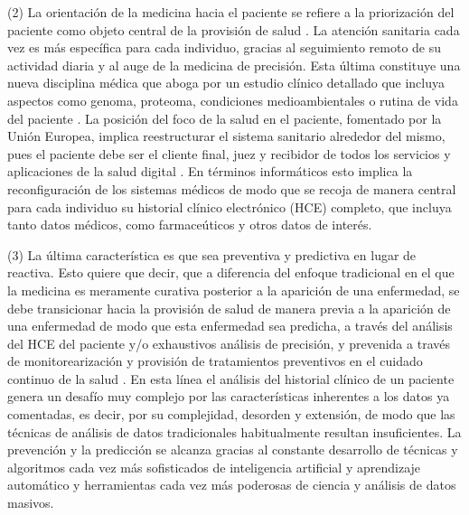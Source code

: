 
(2) La orientación de la medicina hacia el paciente se refiere a la priorización del paciente como objeto central de la provisión de salud  \cite{tortorella2020healthcare}. La atención sanitaria cada vez es más específica para cada individuo, gracias al seguimiento remoto de su actividad diaria y al auge de la medicina de precisión. Esta última constituye una nueva disciplina médica que aboga por un estudio clínico detallado que incluya aspectos como genoma, proteoma, condiciones medioambientales o rutina de vida del paciente \cite{ruiz2023inteligencia}. La posición del foco de la salud en el paciente, fomentado por la Unión Europea,  implica reestructurar el sistema sanitario alrededor del mismo, pues el paciente debe ser el cliente final, juez y recibidor de todos los servicios y aplicaciones de la salud digital \cite{ntafi2022legal} \cite{katehakis2019framework}. En términos informáticos esto implica la reconfiguración de los sistemas médicos de modo que se recoja de manera central para cada individuo su historial clínico electrónico (HCE) completo, que incluya tanto datos médicos, como farmaceúticos y otros datos de interés.  



(3) La última característica es que sea preventiva y predictiva en lugar de reactiva. Esto quiere que decir, que a diferencia del enfoque tradicional en el que la medicina es meramente curativa posterior a la aparición de una enfermedad, se debe transicionar hacia la provisión de salud de manera previa a la aparición de una enfermedad de modo que esta enfermedad sea predicha, a través del análisis del HCE del paciente y/o exhaustivos análisis de precisión, y prevenida a través de monitorearización y provisión de tratamientos preventivos en el cuidado continuo de la salud \cite{ruiz2023inteligencia}. En esta línea el análisis del historial clínico de un paciente genera un desafío muy complejo por las características inherentes a los datos ya comentadas, es decir, por su complejidad, desorden y extensión, de modo que las técnicas de análisis de datos tradicionales habitualmente resultan insuficientes. La prevención y la predicción se alcanza gracias al constante desarrollo de técnicas y algoritmos cada vez más sofisticados de inteligencia artificial y aprendizaje automático y herramientas cada vez más poderosas de ciencia y análisis de datos masivos.


